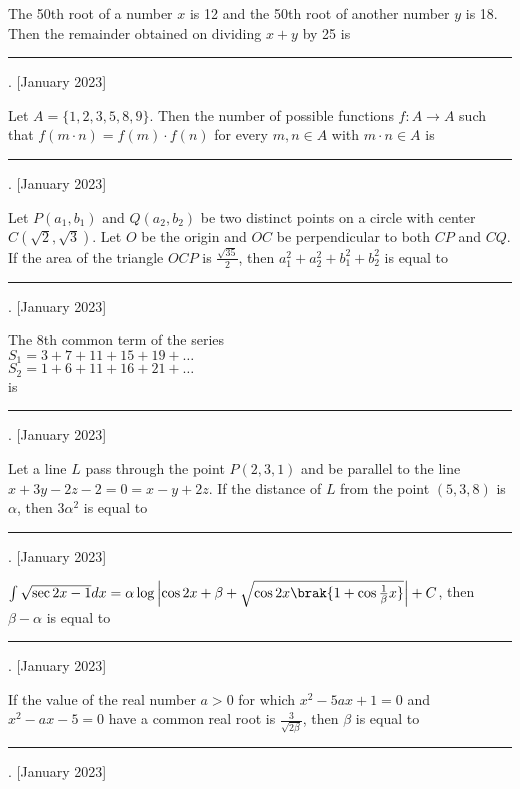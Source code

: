 \iffalse
\title{January 2023}
\author{AI24BTECH11012}
\section{integer}
\fi
    \item The 50th root of a number $x$ is 12 and the 50th root of another number $y$ is 18. Then the remainder obtained on dividing $x + y$ by 25 is \rule{2.5cm}{0.4pt}.
    \hfill{[January 2023]}
    
    \item Let $A = \{1, 2, 3, 5, 8, 9\}$. Then the number of possible functions $f: A \to A$ such that $f(m \cdot n) = f(m) \cdot f(n)$ for every $m, n \in A$ with $m \cdot n \in A$ is \rule{2.5cm}{0.4pt}.
    \hfill{[January 2023]}
    
    \item Let $P(a_1, b_1)$ and $Q(a_2, b_2)$ be two distinct points on a circle with center $C(\sqrt{2}, \sqrt{3})$. Let $O$ be the origin and $OC$ be perpendicular to both $CP$ and $CQ$. If the area of the triangle $OCP$ is $\frac{\sqrt{35}}{2}$, then $a_1^2 + a_2^2 + b_1^2 + b_2^2$ is equal to \rule{2.5cm}{0.4pt}.
    \hfill{[January 2023]}
    
    \item The 8th common term of the series\\$S_1 = 3 + 7 + 11 + 15 + 19 + \dots$\\$S_2 = 1 + 6 + 11 + 16 + 21 + \dots$\\is \rule{2.5cm}{0.4pt}.
    \hfill{[January 2023]}
    
    \item Let a line $L$ pass through the point $P(2, 3, 1)$ and be parallel to the line $x + 3y - 2z - 2 = 0 = x - y + 2z$. If the distance of $L$ from the point $(5, 3, 8)$ is $\alpha$, then $3\alpha^2$ is equal to \rule{2.5cm}{0.4pt}.
    \hfill{[January 2023]}
    
    \item $\int \sqrt{\sec{2x} - 1} dx = \alpha\log \left| \cos{2x}+\beta+\sqrt{\cos{2x}\brak{1+\cos{\frac{1}{\beta}x}}} \right| + C$, then $\beta - \alpha$ is equal to \rule{2.5cm}{0.4pt}.
    \hfill{[January 2023]}
    
    \item If the value of the real number $a > 0$ for which $x^2 - 5ax + 1 = 0$ and $x^2 - ax - 5 = 0$ have a common real root is $\frac{3}{\sqrt{2\beta}}$, then $\beta$ is equal to \rule{2.5cm}{0.4pt}.
    \hfill{[January 2023]}
    

